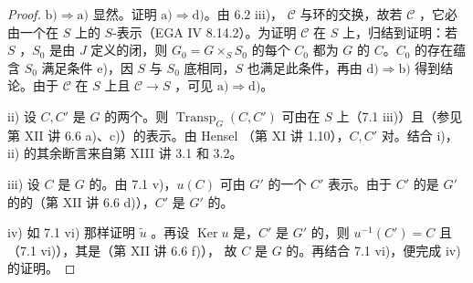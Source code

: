 \begin{proof}
$\mathrm{b)}\Rightarrow\mathrm{a)}$ 显然。证明 $\mathrm{a)}\Rightarrow\mathrm{d)}$。由 6.2 iii)， $\mathcal C$ 与环的交换，故若 $\mathcal C$ ，它必由一个在 $S$ 上的 $S$-表示（EGA IV 8.14.2）。为证明 $\mathcal C$ 在 $S$ 上，归结到证明：若 $S$ ，$S_0$ 是由 $J$ 定义的闭，则 $G_0=G\times_S S_0$ 的每个 $C_0$ 都为 $G$ 的 $C$。$C_0$ 的存在蕴含 $S_0$ 满足条件 e)，因 $S$ 与 $S_0$ 底相同，$S$ 也满足此条件，再由 $\mathrm{d)}\Rightarrow\mathrm{b)}$ 得到结论。由于 $\mathcal C$ 在 $S$ 上且 $\mathcal C\to S$ ，可见 $\mathrm{a)}\Rightarrow\mathrm{d)}$。

ii) 设 $C,C'$ 是 $G$ 的两个。则 $\operatorname{Transp}_G(C,C')$ 可由在 $S$ 上（7.1 iii)）且（参见第 XII 讲 6.6 a)、c)）的表示。由 Hensel （第 XI 讲 1.10），$C,C'$ 对。结合 i)，ii) 的其余断言来自第 XIII 讲 3.1 和 3.2。

iii) 设 $C$ 是 $G$ 的。由 7.1 v)，$u(C)$ 可由 $G'$ 的一个 $C'$ 表示。由于 $C'$ 的是 $G'$ 的的（第 XII 讲 6.6 d)），$C'$ 是 $G'$ 的。

iv) 如 7.1 vi) 那样证明 $\widetilde u$ 。再设 $\operatorname{Ker}u$ 是，$C'$ 是 $G'$ 的，则 $u^{-1}(C')=C$ 且（7.1 vi)），其是（第 XII 讲 6.6 f)），
故 $C$ 是 $G$ 的。再结合 7.1 vi)，便完成 iv) 的证明。
\end{proof}

